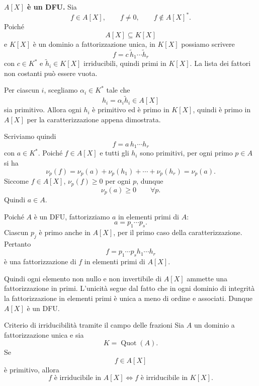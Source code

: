\documentclass[a4paper]{article}
\begin{document}
\begin{radioactive}
\begin{snippetproof}{}
    \textbf{\(A[X]\) è un DFU.}
    Sia
    \[
        f\in A[X],
        \qquad
        f\neq 0,
        \qquad
        f\notin A[X]^\ast.
    \]
    Poiché
    \[
        A[X]\subseteq K[X]
    \]
    e \(K[X]\) è un dominio a fattorizzazione unica, in \(K[X]\) possiamo scrivere
    \[
        f=c\,\widetilde{h}_1\cdots \widetilde{h}_r
    \]
    con \(c\in K^\ast\) e \(\widetilde{h}_i\in K[X]\) irriducibili, quindi primi in \(K[X]\).
    La lista dei fattori non costanti può essere vuota.

    Per ciascun \(i\), scegliamo \(\alpha_i\in K^\ast\) tale che
    \[
        h_i=\alpha_i\widetilde{h}_i\in A[X]
    \]
    sia primitivo.
    Allora ogni \(h_i\) è primitivo ed è primo in \(K[X]\), quindi è primo in \(A[X]\) per la caratterizzazione appena dimostrata.

    Scriviamo quindi
    \[
        f=a\,h_1\cdots h_r
    \]
    con \(a\in K^\ast\).
    Poiché \(f\in A[X]\) e tutti gli \(h_i\) sono primitivi, per ogni primo \(p\in A\) si ha
    \[
        \nu_p(f)
        =
        \nu_p(a)+\nu_p(h_1)+\cdots+\nu_p(h_r)
        =
        \nu_p(a).
    \]
    Siccome \(f\in A[X]\), \(\nu_p(f)\geq 0\) per ogni \(p\), dunque
    \[
        \nu_p(a)\geq 0
        \qquad
        \forall p.
    \]
    Quindi \(a\in A\).

    Poiché \(A\) è un DFU, fattorizziamo \(a\) in elementi primi di \(A\):
    \[
        a=p_1\cdots p_s.
    \]
    Ciascun \(p_j\) è primo anche in \(A[X]\), per il primo caso della caratterizzazione.
    Pertanto
    \[
        f=p_1\cdots p_s h_1\cdots h_r
    \]
    è una fattorizzazione di \(f\) in elementi primi di \(A[X]\).

    Quindi ogni elemento non nullo e non invertibile di \(A[X]\) ammette una fattorizzazione in primi. L'unicità segue dal fatto che in ogni dominio di integrità la fattorizzazione in elementi primi è unica a meno di ordine e associati.
    Dunque \(A[X]\) è un DFU.
\end{snippetproof}
\end{radioactive}

\begin{radioactive}
\begin{snippetcorollary}{Criterio di irriducibilità tramite il campo delle frazioni}
    Sia \(A\) un dominio a fattorizzazione unica e sia
    \[
        K=\operatorname{Quot}(A).
    \]
    Se
    \[
        f\in A[X]
    \]
    è primitivo, allora
    \[
        f \text{ è irriducibile in } A[X]
        \iff
        f \text{ è irriducibile in } K[X].
    \]
\end{snippetcorollary}
\end{radioactive}
\end{document}
